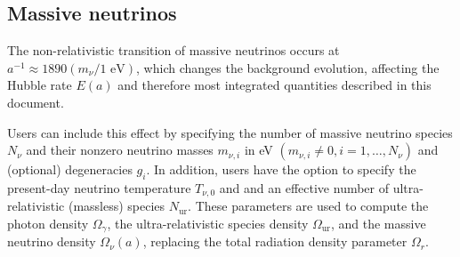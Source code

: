 
\subsection{Massive neutrinos}

The non-relativistic transition of massive neutrinos occurs at $a^{-1}\approx 1890 (m_\nu/1\text{ eV})$, which changes the background evolution, affecting the Hubble rate $E(a)$ and therefore most integrated quantities described in this document.

Users can include this effect by specifying the number of massive neutrino species $N_\nu$ and their nonzero neutrino masses $m_{\nu,i}$ in eV $(m_{\nu,i}\neq 0, i=1,\dots,N_\nu)$ and (optional) degeneracies $g_i$. In addition, users have the option to specify the present-day neutrino temperature $T_{\nu,0}$ and and an effective number of ultra-relativistic (massless) species $N_\mathrm{ur}$. These parameters are used to compute the photon density $\Omega_\gamma$, the ultra-relativistic species density $\Omega_\mathrm{ur}$, and the massive neutrino density $\Omega_\nu(a)$, replacing the total radiation density parameter $\Omega_r$.

